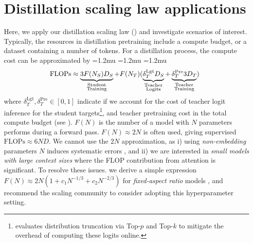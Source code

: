 \section{Distillation scaling law applications}
\label{sec:distillation-scaling-law-applications}

Here, we apply our distillation scaling law ()
and investigate scenarios of interest.
Typically, the resources in distillation pretraining include a compute budget, or a dataset containing a number of tokens.
For a distillation process, the compute cost can be approximated by
{
		\medmuskip=1.2mu
		\thinmuskip=1.2mu
		\thickmuskip=1.2mu
\begin{equation}
    \hspace{-.2cm}
    \mathrm{FLOPs}\approx
    \underbrace{3F(N_S)D_S}_{\substack{\mathrm{Student}\\\mathrm{Training}}}
    +F(N_T)(
    \underbrace{\delta_T^{\mathrm{Lgt}}D_S}_{\substack{\mathrm{Teacher}\\\mathrm{Logits}}} + \underbrace{\delta_T^{\mathrm{Pre}}3D_T}_{\substack{\mathrm{Teacher}\\\mathrm{Training}}})
    \label{eq:distillation-compute}
\end{equation}
}where 
$\delta_T^{\mathrm{Lgt}},\delta_T^{\mathrm{Pre}}\in[0,1]$ 
indicate if we account for the cost of teacher logit inference for the student targets\footnote{ evaluates distribution truncation via Top-$p$ and Top-$k$ to mitigate the overhead of computing these logits online.}, and teacher pretraining cost in the total compute budget (see ).
$F(N)$ is the number of \flops a model with $N$ parameters
performs during a forward pass.
$F(N)\approx 2N$ is often used, giving supervised $\mathrm{FLOPs}\approx 6ND$.
We cannot use the $2N$ approximation, as i) using \emph{non-embedding} parameters $N$ induces systematic errors \citep{DBLP:journals/corr/abs-2406-19146},
and ii) we are interested in \emph{small models with large context sizes} where the FLOP contribution from attention is significant.
To resolve these issues.
we derive a simple expression $F(N)\approx 2N(1+c_1N^{-1/3}+c_2N^{-2/3})$
for \emph{fixed-aspect ratio} models
, and recommend the scaling community to consider adopting this hyperparameter setting.

